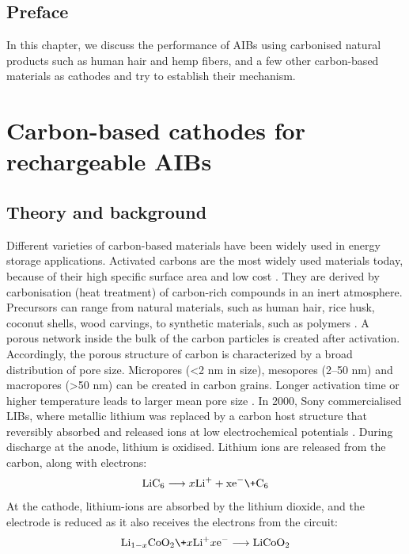 \section*{Preface}
In this chapter, we discuss the performance of AIBs using carbonised natural products such as human hair and hemp fibers, and a few other carbon-based materials as cathodes and try to establish their mechanism.
\pagebreak
\chapter{Carbon-based cathodes for rechargeable AIBs} %

\label{chap5} %

\section{Theory and background}
Different varieties of carbon-based materials have been widely used in energy storage applications. Activated carbons are the most widely used materials today, because of their high specific surface area and low cost \cite{wang_review_2012}. They are derived by carbonisation (heat treatment) of carbon-rich compounds in an inert atmosphere. Precursors can range from natural materials, such as human hair, rice husk, coconut shells, wood carvings, to synthetic materials, such as polymers \cite{hulico,si,yalcin,barton}. A porous network inside the bulk of the carbon particles is created after activation. Accordingly, the porous structure of carbon is characterized by a broad distribution of pore size. Micropores (<2 nm in size), mesopores (2–50 nm) and macropores (>50 nm) can be created in carbon grains. Longer activation time or higher temperature leads to larger mean pore size \cite{simon_materials_2008}. In 2000, Sony commercialised LIBs, where metallic lithium was replaced by a carbon host structure that reversibly absorbed and released  ions at low electrochemical potentials \cite{ozawa_lithium-ion_1994}.
During discharge at the anode, lithium is oxidised. Lithium ions are released from the carbon, along with electrons:
\begin{equation}
\ce{LiC6} \longrightarrow x\ce{Li+} \ce{+xe-} \+ \ce{C6}
\end{equation}
At the cathode, lithium-ions are absorbed by the lithium dioxide, and the electrode is reduced as it also receives the electrons from the circuit:
\begin{equation}
\ce{Li_{1-x}CoO2} \+ x\ce{Li+} x\ce{e-} \longrightarrow \ce{LiCoO2}
\end{equation}
